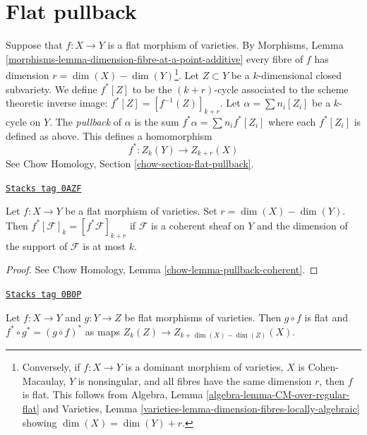 \section{Flat pullback}
\label{intersection-section-flat-pullback}
Suppose that $f : X \to Y$ is a flat morphism of varieties.
By Morphisms, Lemma
\ref{morphisms-lemma-dimension-fibre-at-a-point-additive}
every fibre of $f$ has dimension $r = \dim(X) - \dim(Y)$\footnote{Conversely,
if $f : X \to Y$ is a dominant morphism of varieties,
$X$ is Cohen-Macaulay, $Y$ is nonsingular, and all fibres have
the same dimension $r$, then $f$ is flat. This follows from
Algebra, Lemma \ref{algebra-lemma-CM-over-regular-flat} and
Varieties, Lemma \ref{varieties-lemma-dimension-fibres-locally-algebraic}
showing $\dim(X) = \dim(Y) + r$.}.
Let $Z \subset Y$ be a $k$-dimensional closed subvariety. We define
$f^*[Z]$ to be the $(k + r)$-cycle associated to the scheme theoretic
inverse image: $f^*[Z] = [f^{-1}(Z)]_{k + r}$. Let
$\alpha = \sum n_i [Z_i]$ be a $k$-cycle on $Y$. The {\it pullback} of
$\alpha$ is the sum $f^* \alpha = \sum n_i f^*[Z_i]$ where each $f^*[Z_i]$
is defined as above. This defines a homomorphism
$$
f^* : Z_k(Y) \longrightarrow Z_{k + r}(X)
$$
See Chow Homology, Section \ref{chow-section-flat-pullback}.

\begin{lemma}[Pullback]
\label{intersection-lemma-pullback}
\href{https://stacks.math.columbia.edu/tag/0AZF}{\texttt{Stacks tag 0AZF}}

Let $f : X \to Y$ be a flat morphism of varieties. Set $r = \dim(X) - \dim(Y)$.
Then $f^*[\mathcal{F}]_k = [f^*\mathcal{F}]_{k + r}$
if $\mathcal{F}$ is a coherent sheaf on $Y$ and the dimension of the
support of $\mathcal{F}$ is at most $k$.
\end{lemma}

\begin{proof}
See Chow Homology, Lemma \ref{chow-lemma-pullback-coherent}.
\end{proof}

\begin{lemma}
\label{intersection-lemma-compose-flat-pullback}
\href{https://stacks.math.columbia.edu/tag/0B0P}{\texttt{Stacks tag 0B0P}}

Let $f : X \to Y$ and $g : Y \to Z$ be flat morphisms of
varieties. Then $g \circ f$ is flat and $f^* \circ g^* = (g \circ f)^*$
as maps $Z_k(Z) \to Z_{k + \dim(X) - \dim(Z)}(X)$.
\end{lemma}

